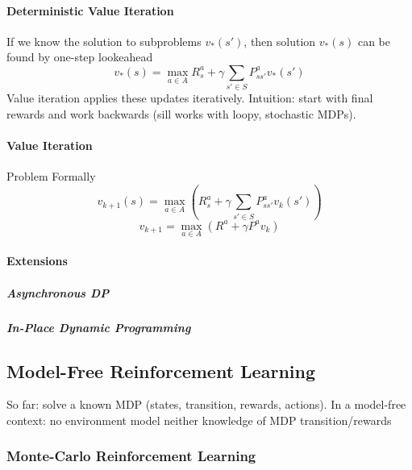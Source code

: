 \documentclass[10pt]{report}
\begin{document}
\paragraph{Deterministic Value Iteration} If we know the solution to subproblems $v_*(s')$, then solution $v_*(s)$ can be found by one-step lookeahead
$$v_*(s) = \max_{a\in A} R_s^a + \gamma\sum_{s'\in S} P_{ss'}^av_*(s')$$
Value iteration applies these updates iteratively. Intuition: start with final rewards and work backwards (sill works with loopy, stochastic MDPs).
\paragraph{Value Iteration} Problem %
Formally
$$v_{k+1}(s) = \max_{a\in A}\left(R_s^a + \gamma\sum_{s'\in S} P_{ss'}^a v_k(s')\right)$$
$$v_{k+1} = \max_{a\in A}(R^a + \gamma P^a v_k)$$
\paragraph{Extensions}
\subparagraph{Asynchronous DP}
\subparagraph{In-Place Dynamic Programming}
\subsection{Model-Free Reinforcement Learning}
So far: solve a known MDP (states, transition, rewards, actions). In a model-free context: no environment model neither knowledge of MDP transition/rewards %
\subsubsection{Monte-Carlo Reinforcement Learning}
\end{document}

